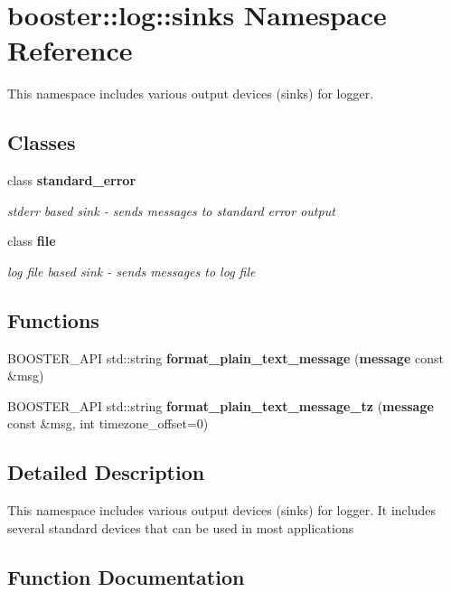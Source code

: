 \section{booster\-:\-:log\-:\-:sinks \-Namespace \-Reference}
\label{namespacebooster_1_1log_1_1sinks}


\-This namespace includes various output devices (sinks) for logger.  


\subsection*{\-Classes}
\begin{DoxyCompactItemize}
\item 
class {\bf standard\-\_\-error}
\begin{DoxyCompactList}\small\item\em stderr based sink -\/ sends messages to standard error output \end{DoxyCompactList}\item 
class {\bf file}
\begin{DoxyCompactList}\small\item\em log file based sink -\/ sends messages to log file \end{DoxyCompactList}\end{DoxyCompactItemize}
\subsection*{\-Functions}
\begin{DoxyCompactItemize}
\item 
\-B\-O\-O\-S\-T\-E\-R\-\_\-\-A\-P\-I std\-::string {\bf format\-\_\-plain\-\_\-text\-\_\-message} ({\bf message} const \&msg)
\item 
\-B\-O\-O\-S\-T\-E\-R\-\_\-\-A\-P\-I std\-::string {\bf format\-\_\-plain\-\_\-text\-\_\-message\-\_\-tz} ({\bf message} const \&msg, int timezone\-\_\-offset=0)
\end{DoxyCompactItemize}


\subsection{\-Detailed \-Description}
\-This namespace includes various output devices (sinks) for logger. \-It includes several standard devices that can be used in most applications 

\subsection{\-Function \-Documentation}
